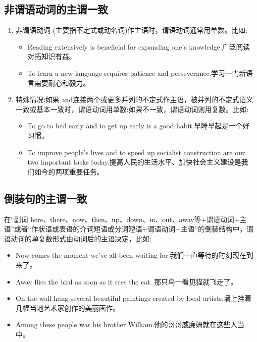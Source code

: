 \subsection{非谓语动词的主谓一致}

\begin{enumerate}
  \item 非谓语动词 (主要指不定式或动名词)作主语时，谓语动词通常用单数。比如:
        \begin{itemize}
          \item Reading extensively is beneficial for expanding one's knowledge.广泛阅读对拓知识有益。
          \item To learn a new language requires patience and perseverance.学习一门新语言需要耐心和毅力。
        \end{itemize}
  \item 特殊情况:如果 and连接两个或更多并列的不定式作主语，被并列的不定式语义一致或基本一致时，谓语动词用单数;如果不一致，谓语动词则用复数。比如:
        \begin{itemize}
          \item To go to bed early and to get up early is a good habit.早睡早起是一个好习惯。
          \item To improve people's lives and to speed up socialist construction are our two important tasks today.提高人民的生活水平、加快社会主义建设是我们如今的两项重要任务。
        \end{itemize}
\end{enumerate}

\subsection{倒装句的主谓一致}

在“副词 here、there、now、then、up、down、in、out、away等+谓语动词+主语”或者“作状语或表语的介词短语或分词短语+谓语动词+主语”的倒装结构中，谓语动词的单复数形式由动词后的主语决定，比如:
\begin{itemize}
  \item Now comes the moment we've all been waiting for.我们一直等待的时刻现在到来了。
  \item Away flies the bird as soon as it sees the cat. 那只鸟一看见猫就飞走了。
  \item On the wall hang several beautiful paintings created by local artists.墙上挂着几幅当地艺术家创作的美丽画作。
  \item Among these people was his brother William.他的哥哥威廉姆就在这些人当中。
\end{itemize}

